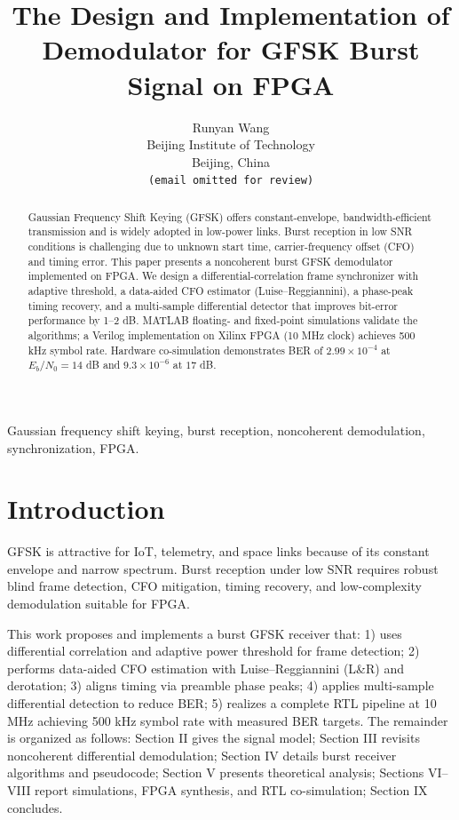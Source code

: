 \documentclass[conference]{IEEEtran}
\title{The Design and Implementation of Demodulator for GFSK Burst Signal on FPGA}
\author{Runyan Wang\\
Beijing Institute of Technology\\
Beijing, China\\
\texttt{(email omitted for review)}}
\begin{document}
\maketitle

\begin{abstract}
Gaussian Frequency Shift Keying (GFSK) offers constant-envelope, bandwidth-efficient transmission and is widely adopted in low-power links. Burst reception in low SNR conditions is challenging due to unknown start time, carrier-frequency offset (CFO) and timing error. This paper presents a noncoherent burst GFSK demodulator implemented on FPGA. We design a differential-correlation frame synchronizer with adaptive threshold, a data-aided CFO estimator (Luise--Reggiannini), a phase-peak timing recovery, and a multi-sample differential detector that improves bit-error performance by 1--2 dB. MATLAB floating- and fixed-point simulations validate the algorithms; a Verilog implementation on Xilinx FPGA (10 MHz clock) achieves 500 kHz symbol rate. Hardware co-simulation demonstrates BER of $2.99\times10^{-4}$ at $E_b/N_0=14$ dB and $9.3\times10^{-6}$ at $17$ dB.
\end{abstract}

\begin{IEEEkeywords}
Gaussian frequency shift keying, burst reception, noncoherent demodulation, synchronization, FPGA.
\end{IEEEkeywords}

\section{Introduction}
GFSK is attractive for IoT, telemetry, and space links because of its constant envelope and narrow spectrum. Burst reception under low SNR requires robust blind frame detection, CFO mitigation, timing recovery, and low-complexity demodulation suitable for FPGA.

This work proposes and implements a burst GFSK receiver that: 1) uses differential correlation and adaptive power threshold for frame detection; 2) performs data-aided CFO estimation with Luise--Reggiannini (L\&R) and derotation; 3) aligns timing via preamble phase peaks; 4) applies multi-sample differential detection to reduce BER; 5) realizes a complete RTL pipeline at 10 MHz achieving 500 kHz symbol rate with measured BER targets. The remainder is organized as follows: Section II gives the signal model; Section III revisits noncoherent differential demodulation; Section IV details burst receiver algorithms and pseudocode; Section V presents theoretical analysis; Sections VI--VIII report simulations, FPGA synthesis, and RTL co-simulation; Section IX concludes.
\end{document}
